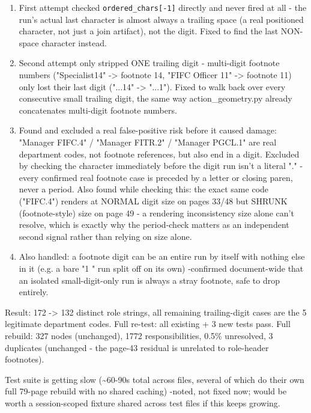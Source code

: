 \begin{enumerate}
\item First attempt checked \texttt{ordered\_\allowbreak{}chars[-1]} directly and never fired at all - the run's actual last character is almost always a trailing space (a real positioned character, not just a join artifact), not the digit. Fixed to find the last NON-space character instead.
\item Second attempt only stripped ONE trailing digit - multi-digit footnote numbers ("Specialist14" -> footnote 14, "FIFC Officer 11" -> footnote 11) only lost their last digit ("...14" -> "...1"). Fixed to walk back over every consecutive small trailing digit, the same way action\_geometry.py already concatenates multi-digit footnote numbers.
\item Found and excluded a real false-positive risk before it caused damage: "Manager FIFC.4" / "Manager FITR.2" / "Manager PGCL.1" are real department codes, not footnote references, but also end in a digit. Excluded by checking the character immediately before the digit run isn't a literal "." - every confirmed real footnote case is preceded by a letter or closing paren, never a period. Also found while checking this: the exact same code ("FIFC.4") renders at NORMAL digit size on pages 33/48 but SHRUNK (footnote-style) size on page 49 - a rendering inconsistency size alone can't resolve, which is exactly why the period-check matters as an independent second signal rather than relying on size alone.
\item Also handled: a footnote digit can be an entire run by itself with nothing else in it (e.g. a bare "1 " run split off on its own) -confirmed document-wide that an isolated small-digit-only run is always a stray footnote, safe to drop entirely.
\end{enumerate}
Result: 172 -> 132 distinct role strings, all remaining trailing-digit cases are the 5 legitimate department codes. Full re-test: all existing + 3 new tests pass. Full rebuild: 327 nodes (unchanged), 1772 responsibilities, 0.5\% unresolved, 3 duplicates (unchanged - the page-43 residual is unrelated to role-header footnotes).

Test suite is getting slow (\textasciitilde{}60-90s total across files, several of which do their own full 79-page rebuild with no shared caching) -noted, not fixed now; would be worth a session-scoped fixture shared across test files if this keeps growing.

